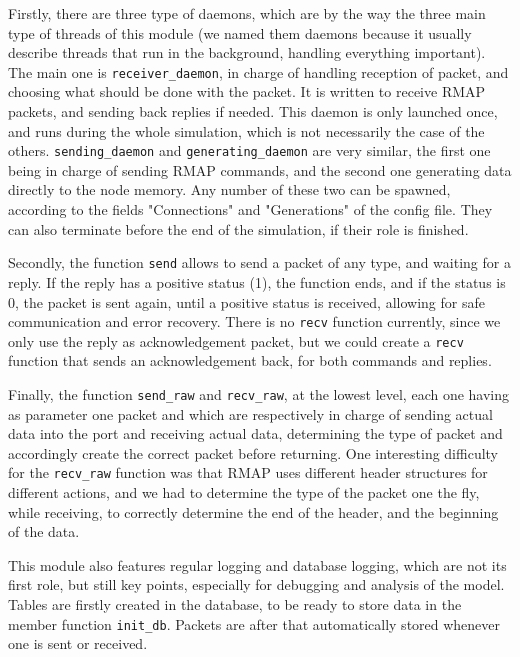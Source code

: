 \documentclass[12pt,a4paper]{article}
\begin{document}
Firstly, there are three type of daemons, which are by the way the three main type of threads of this module (we named them daemons because it usually describe threads that run in the background, handling everything important). The main one is \texttt{receiver\_daemon}, in charge of handling reception of packet, and choosing what should be done with the packet. It is written to receive RMAP packets, and sending back replies if needed. This daemon is only launched once, and runs during the whole simulation, which is not necessarily the case of the others. \texttt{sending\_daemon} and \texttt{generating\_daemon} are very similar, the first one being in charge of sending RMAP commands, and the second one generating data directly to the node memory. Any number of these two can be spawned, according to the fields "Connections" and "Generations" of the config file. They can also terminate before the end of the simulation, if their role is finished.

Secondly, the function \texttt{send} allows to send a packet of any type, and waiting for a reply. If the reply has a positive status (1), the function ends, and if the status is 0, the packet is sent again, until a positive status is received, allowing for safe communication and error recovery. There is no \texttt{recv} function currently, since we only use the reply as acknowledgement packet, but we could create a \texttt{recv} function that sends an acknowledgement back, for both commands and replies.

Finally, the function \texttt{send\_raw} and \texttt{recv\_raw}, at the lowest level, each one having as parameter one packet and which are respectively in charge of sending actual data into the port and receiving actual data, determining the type of packet and accordingly create the correct packet before returning. One interesting difficulty for the \texttt{recv\_raw} function was that RMAP uses different header structures for different actions, and we had to determine the type of the packet one the fly, while receiving, to correctly determine the end of the header, and the beginning of the data.\medbreak

This module also features regular logging and database logging, which are not its first role, but still key points, especially for debugging and analysis of the model. Tables are firstly created in the database, to be ready to store data in the member function \texttt{init\_db}. Packets are after that automatically stored whenever one is sent or received.
\end{document}
